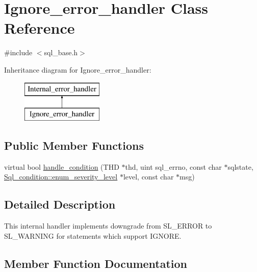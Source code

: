\hypertarget{classIgnore__error__handler}{}\section{Ignore\+\_\+error\+\_\+handler Class Reference}
\label{classIgnore__error__handler}


{\ttfamily \#include $<$sql\+\_\+base.\+h$>$}

Inheritance diagram for Ignore\+\_\+error\+\_\+handler\+:\begin{figure}[H]
\begin{center}
\leavevmode
\includegraphics[height=2.000000cm]{classIgnore__error__handler}
\end{center}
\end{figure}
\subsection*{Public Member Functions}
\begin{DoxyCompactItemize}
\item 
virtual bool \mbox{\hyperlink{classIgnore__error__handler_a71059191bd9ed725f1df2eeb47fc167b}{handle\+\_\+condition}} (T\+HD $\ast$thd, uint sql\+\_\+errno, const char $\ast$sqlstate, \mbox{\hyperlink{classSql__condition_ab0602581e19cddb609bfe10c44be4e83}{Sql\+\_\+condition\+::enum\+\_\+severity\+\_\+level}} $\ast$level, const char $\ast$msg)
\end{DoxyCompactItemize}


\subsection{Detailed Description}
This internal handler implements downgrade from S\+L\+\_\+\+E\+R\+R\+OR to S\+L\+\_\+\+W\+A\+R\+N\+I\+NG for statements which support I\+G\+N\+O\+RE. 

\subsection{Member Function Documentation}
\mbox{\label{classIgnore__error__handler_a71059191bd9ed725f1df2eeb47fc167b}} 
